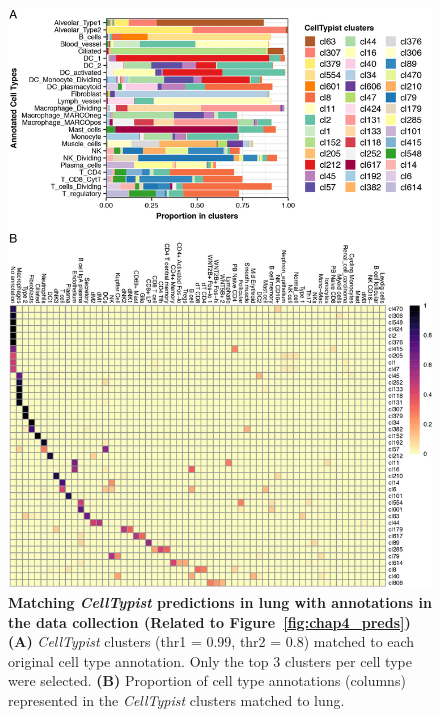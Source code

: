 \begin{figure}[pht!] 
\centering
\includegraphics[scale=0.93]{Appendix3/Figs/appB_lung_labs_exp.png} %
\caption[Matching \textit{CellTypist} predictions in lung with annotations in the data collection]{\textbf{Matching \textit{CellTypist} predictions in lung with annotations in the data collection (Related to Figure~\ref{fig:chap4_preds})}\newline\textbf{(A)} \textit{CellTypist} clusters (thr1 = 0.99, thr2 = 0.8) matched to each original cell type annotation. Only the top 3 clusters per cell type were selected. \textbf{(B)} Proportion of cell type annotations (columns) represented in the \textit{CellTypist} clusters matched to lung.}
\label{fig:appB_lunglabs}
\end{figure}


